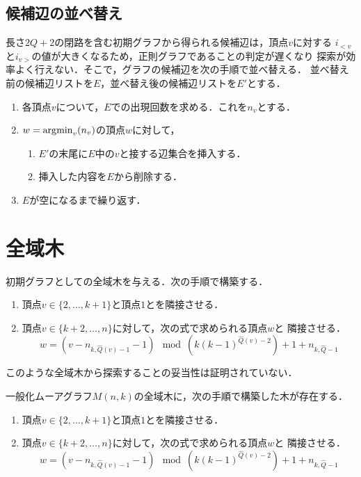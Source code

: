 \subsection*{候補辺の並べ替え}
長さ$2Q+2$の閉路を含む初期グラフから得られる候補辺は，頂点$v$に対する
$i_{<v}$と$i_{v>}$の値が大きくなるため，正則グラフであることの判定が遅くなり
探索が効率よく行えない．そこで，グラフの候補辺を次の手順で並べ替える．
並べ替え前の候補辺リストを$E$，並べ替え後の候補辺リストを$E'$とする．
\begin{enumerate}
\item 各頂点$v$について，$E$での出現回数を求める．これを$n_v$とする．
\item $w=\operatorname*{\arg\!\min}_{v}(n_v)$の頂点$w$に対して，
  \begin{enumerate}
  \item $E'$の末尾に$E$中の$v$と接する辺集合を挿入する．
  \item 挿入した内容を$E$から削除する．
  \end{enumerate}
\item $E$が空になるまで繰り返す．
\end{enumerate}

\section{全域木}
\label{sect:initial-spanning-tree}
初期グラフとしての全域木を与える．次の手順で構築する．
\begin{enumerate}
\item 頂点$v\in\{2,\ldots,k+1\}$と頂点$1$とを隣接させる．
\item 頂点$v\in\{k+2,\ldots,n\}$に対して，次の式で求められる頂点$w$と
  隣接させる．
  \[ w=(v-n_{k,\hat{Q}(v)-1}-1)\mod(k(k-1)^{\hat{Q}(v)-2})+1+n_{k,\hat{Q}-1} \]
\end{enumerate}
このような全域木から探索することの妥当性は証明されていない．
\begin{conjecture}
  \label{conj:spanning-tree}
  一般化ムーアグラフ$M(n,k)$の全域木に，次の手順で構築した木が存在する．
  \begin{enumerate}
  \item 頂点$v\in\{2,\ldots,k+1\}$と頂点$1$とを隣接させる．
  \item 頂点$v\in\{k+2,\ldots,n\}$に対して，次の式で求められる頂点$w$と
    隣接させる．
    \[w=(v-n_{k,\hat{Q}(v)-1}-1)\mod(k(k-1)^{\hat{Q}(v)-2})+1+n_{k,\hat{Q}-1}\]
  \end{enumerate}
\end{conjecture}


